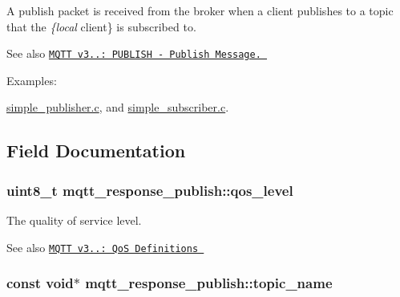 A publish packet is received from the broker when a client publishes to a topic that the {\itshape \{local} client\} is subscribed to. 

\begin{DoxySeeAlso}{See also}
\href{http://docs.oasis-open.org/mqtt/mqtt/v3.1.1/os/mqtt-v3.1.1-os.html#_Toc398718037}{\tt M\+Q\+TT v3..\+: P\+U\+B\+L\+I\+SH -\/ Publish Message. } 
\end{DoxySeeAlso}
\begin{Desc}
\item[Examples\+: ]\par
\hyperlink{simple_publisher_8c-example}{simple\+\_\+publisher.\+c}, and \hyperlink{simple_subscriber_8c-example}{simple\+\_\+subscriber.\+c}.\end{Desc}


\subsection{Field Documentation}
\subsubsection[{\texorpdfstring{qos\+\_\+level}{qos_level}}]{\setlength{\rightskip}{0pt plus 5cm}uint8\+\_\+t mqtt\+\_\+response\+\_\+publish\+::qos\+\_\+level}\hypertarget{structmqtt__response__publish_ab6bc13774afcff002ce4f9afbee05493}{}\label{structmqtt__response__publish_ab6bc13774afcff002ce4f9afbee05493}


The quality of service level. 

\begin{DoxySeeAlso}{See also}
\href{http://docs.oasis-open.org/mqtt/mqtt/v3.1.1/os/mqtt-v3.1.1-os.html#_Table_3.11_-}{\tt M\+Q\+TT v3..\+: QoS Definitions } 
\end{DoxySeeAlso}
\subsubsection[{\texorpdfstring{topic\+\_\+name}{topic_name}}]{\setlength{\rightskip}{0pt plus 5cm}const void$\ast$ mqtt\+\_\+response\+\_\+publish\+::topic\+\_\+name}\hypertarget{structmqtt__response__publish_a5f35698c457c51f8099ff1d8f4198403}{}\label{structmqtt__response__publish_a5f35698c457c51f8099ff1d8f4198403}


